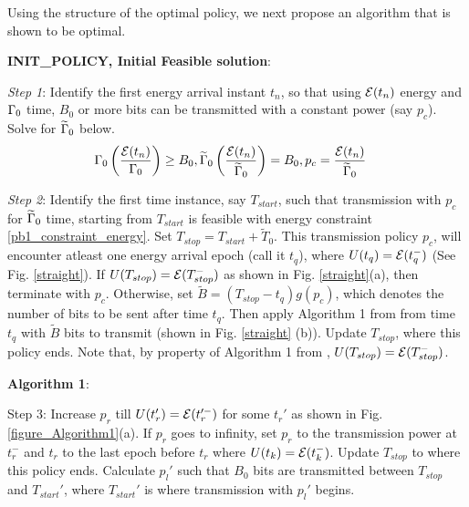 
%

Using the structure of the optimal policy, we next propose an algorithm that is shown to be optimal. 

\textbf{INIT\_POLICY, Initial Feasible solution}:

\textit{Step 1}: Identify the first energy arrival instant $t_n$, so that using $\mathcal{E}(t_n)$ energy and $\Gamma_0$ time, $B_0$ or more bits can be transmitted with a constant power (say $p_c$). Solve for $\widetilde{\Gamma}_0$ below.
\begin{align}
&\TRx_0\left(\dfrac{\ETx(t_n)}{\TRx_0}\right)\ge B_0, \widetilde{\TRx}_0\left(\dfrac{\ETx(t_n)}{\widetilde{\TRx}_0}\right)= B_0, p_c = \dfrac{\ETx({t_n})}{\widetilde{\TRx}_0}
\label{INIT_POLICY_time}
\end{align}

\textit{Step 2}: Identify the first time instance, say $T_{start}$, such that transmission with $p_c$ for $\widetilde{\Gamma}_0$ time, starting from $T_{start}$ is feasible with energy constraint \eqref{pb1_constraint_energy}. Set $T_{stop} = T_{start} + \widetilde{T}_0$. This transmission policy $p_c$, will encounter atleast one energy arrival epoch (call it $t_q$), where $U(t_q) = \mathcal{E}(t_q^-)$ (See Fig. \ref{straight}). If $U(T_{stop}) = \mathcal{E}(T_{stop}^-)$ as shown in Fig. \ref{straight}(a), then terminate with $p_c$. Otherwise, set $\widetilde{B} = (T_{stop} - t_q)g(p_c)$, which denotes the number of bits to be sent after time $t_q$. Then apply Algorithm 1 from \cite{Yang} from time $t_q$ with $\widetilde{B}$ bits to transmit (shown in Fig. \ref{straight} (b)). Update $T_{stop}$, where this policy ends. Note that, by property of Algorithm 1 from \cite{Yang}, $U(T_{stop}) = \mathcal{E}(T_{stop}^-)$.

\textbf{Algorithm 1}:

Step 3: Increase $p_r$ till $U(t_r') = \mathcal{E}(t_r'^-)$ for some $t_r'$ as shown in Fig. \ref{figure_Algorithm1}(a). If $p_r$ goes to infinity, set $p_r$ to the transmission power at $t_r^-$ and $t_r$ to the last epoch before $t_r$ where $U(t_k) = \mathcal{E}(t_k^-)$. Update $T_{stop}$ to where this policy ends. Calculate $p_l'$ such that $B_0$ bits are transmitted between $T_{stop}$ and $T_{start}'$, where $T_{start}'$ is where transmission with $p_l'$ begins.

